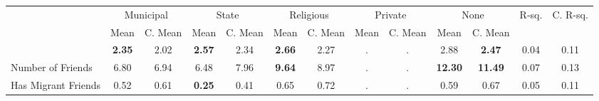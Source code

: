 \begin{tabular}{l c c c c c c c c c c c c}
\toprule
& \multicolumn{2}{c}{Municipal} & \multicolumn{2}{c}{State} & \multicolumn{2}{c}{Religious} & \multicolumn{2}{c}{Private} & \multicolumn{2}{c}{None} & R-sq. & C. R-sq. \\
& \scriptsize Mean & \scriptsize C. Mean & \scriptsize Mean & \scriptsize C. Mean & \scriptsize Mean & \scriptsize C. Mean & \scriptsize Mean & \scriptsize C. Mean & \scriptsize Mean & \scriptsize C. Mean & & \\
\midrule
& \textbf{     2.35} & 2.02 & \textbf{     2.57} & 2.34 & \textbf{     2.66} & 2.27 &         . & . &      2.88 & \textbf{     2.47} &      0.04 &      0.11 \\
Number of Friends &      6.80 & 6.94 &      6.48 & 7.96 & \textbf{     9.64} & 8.97 &         . & . & \textbf{    12.30} & \textbf{    11.49} &      0.07 &      0.13 \\
Has Migrant Friends &      0.52 & 0.61 & \textbf{     0.25} & 0.41 &      0.65 & 0.72 &         . & . &      0.59 & 0.67 &      0.05 &      0.11 \\
\bottomrule
\end{tabular}
